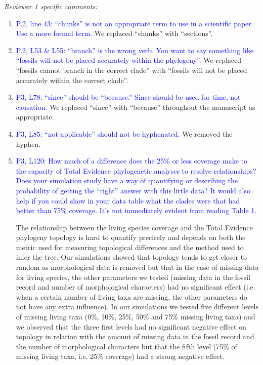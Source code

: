 \documentclass[12pt,letterpaper]{article}
\renewcommand{\subsection}[1]{%
\bigskip
\begin{center}
\begin{large}
\normalfont\itshape #1
\end{large}
\end{center}}
\begin{document}
\subsection{Reviewer 1 specific comments:}
\begin{enumerate}
\item{\textcolor{blue}{P.2, line 43: ``chunks'' is not an appropriate term to use in a scientific paper. Use a more formal term.}}
We replaced ``chunks'' with ``sections''.

\item{\textcolor{blue}{P.2, L53 \& L55: ``branch'' is the wrong verb. You want to say something like ``fossils will not be placed accurately within the phylogeny''.}}
We replaced ``fossils cannot branch in the correct clade'' with ``fossils will not be placed accurately within the correct clade''.

\item{\textcolor{blue}{P3, L78: ``since'' should be ``because.'' Since should be used for time, not causation.}}
We replaced ``since'' with ``because'' throughout the manuscript as appropriate.

\item{\textcolor{blue}{P3, L85: ``not-applicable'' should not be hyphenated.}}
We removed the hyphen.

\item{\textcolor{blue}{P3, L120: How much of a difference does the 25\% or less coverage make to the capacity of Total Evidence phylogenetic analyses to resolve relationships? Does your simulation study have a way of quantifying or describing the probability of getting the ``right'' answer with this little data? It would also help if you could show in your data table what the clades were that had better than 75\% coverage. It's not immediately evident from reading Table 1.}}

The relationship between the living species coverage and the Total Evidence phylogeny topology is hard to quantify precisely and depends on both the metric used for measuring topological differences and the method used to infer the tree.
Our simulations showed that topology tends to get closer to random as morphological data is removed but that in the case of missing data for living species, the other parameters we tested (missing data in the fossil record and number of morphological characters) had no significant effect (i.e. when a certain number of living taxa are missing, the other parameters do not have any extra influence).
In our simulations we tested five different levels of missing living taxa (0\%, 10\%, 25\%, 50\% and 75\% missing living taxa) and we observed that the three first levels had no significant negative effect on topology in relation with the amount of missing data in the fossil record and the number of morphological characters but that the fifth level (75\% of missing living taxa, i.e. 25\% coverage) had a strong negative effect.


\end{enumerate}
\end{document}
